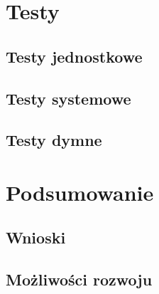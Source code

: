 \documentclass[eng,printmode,openany]{mgr}
\begin{document}
	\newpage
	\chapter{Testy}
	\section{Testy jednostkowe}
	\section{Testy systemowe}
	\section{Testy dymne}
	\newpage
	\chapter{Podsumowanie}
	\section{Wnioski}
	\section{Możliwości rozwoju}
	
	
\end{document}
